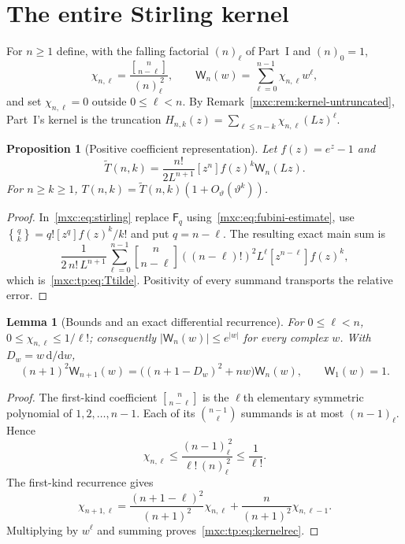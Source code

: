 \documentclass[11pt]{article}
\numberwithin{equation}{section}
\newtheorem{proposition}[theorem]{Proposition}
\newtheorem{lemma}[theorem]{Lemma}
\theoremstyle{definition}
\theoremstyle{remark}
\newcommand{\StirOne}[2]{\genfrac{[}{]}{0pt}{}{#1}{#2}}
\newcommand{\StirTwo}[2]{\genfrac{\{} {\}}{0pt}{}{#1}{#2}}
\begin{document}
\section{The entire Stirling kernel}\label{mxc:tp:sec:kernel}

For $n\ge1$ define, with the falling factorial $(n)_\ell$ of Part~I and
$(n)_0=1$,
\begin{equation}\label{mxc:tp:eq:kerneldef}
 \chi_{n,\ell}=\frac{\StirOne{n}{n-\ell}}{(n)_\ell^{\,2}},\qquad
 \mathsf W_n(w)=\sum_{\ell=0}^{n-1}\chi_{n,\ell}w^\ell,
\end{equation}
and set $\chi_{n,\ell}=0$ outside $0\le\ell<n$. By
Remark~\ref{mxc:rem:kernel-untruncated}, Part~I's kernel is the truncation
$H_{n,k}(z)=\sum_{\ell\le n-k}\chi_{n,\ell}(Lz)^\ell$.

\begin{proposition}[Positive coefficient representation]\label{mxc:tp:prop:kernelrep}
Let $f(z)=e^z-1$ and
\begin{equation}\label{mxc:tp:eq:Ttilde}
 \widetilde T(n,k)=\frac{n!}{2L^{n+1}}[z^n]f(z)^k\mathsf W_n(Lz).
\end{equation}
For $n\ge k\ge1$, $T(n,k)=\widetilde T(n,k)(1+O_\vartheta(\vartheta^k))$.
\end{proposition}
\begin{proof}
In~\eqref{mxc:eq:stirling} replace $\mathsf F_q$
using~\eqref{mxc:eq:fubini-estimate}, use
$\StirTwo qk=q![z^q]f(z)^k/k!$ and put $q=n-\ell$. The resulting exact
main sum is
\[
 \frac{1}{2\,n!\,L^{n+1}}\sum_{\ell=0}^{n-1}\StirOne{n}{n-\ell}
 ((n-\ell)!)^2L^\ell[z^{n-\ell}]f(z)^k,
\]
which is~\eqref{mxc:tp:eq:Ttilde}. Positivity of every summand transports
the relative error.
\end{proof}

\begin{lemma}[Bounds and an exact differential recurrence]\label{mxc:tp:lem:kernelbound}
For $0\le\ell<n$, $0\le\chi_{n,\ell}\le1/\ell!$; consequently
$|\mathsf W_n(w)|\le e^{|w|}$ for every complex $w$. With
$D_w=w\,\mathrm d/\mathrm dw$,
\begin{equation}\label{mxc:tp:eq:kernelrec}
 (n+1)^2\mathsf W_{n+1}(w)=\bigl((n+1-D_w)^2+nw\bigr)\mathsf W_n(w),
 \qquad \mathsf W_1(w)=1.
\end{equation}
\end{lemma}
\begin{proof}
The first-kind coefficient $\StirOne{n}{n-\ell}$ is the $\ell$th
elementary symmetric polynomial of $1,2,\ldots,n-1$. Each of its
$\binom{n-1}{\ell}$ summands is at most $(n-1)_\ell$. Hence
\[
 \chi_{n,\ell}\le\frac{(n-1)_\ell^{\,2}}{\ell!\,(n)_\ell^{\,2}}\le\frac1{\ell!}.
\]
The first-kind recurrence gives
\[
 \chi_{n+1,\ell}=\frac{(n+1-\ell)^2}{(n+1)^2}\chi_{n,\ell}
 +\frac{n}{(n+1)^2}\chi_{n,\ell-1}.
\]
Multiplying by $w^\ell$ and summing proves~\eqref{mxc:tp:eq:kernelrec}.
\end{proof}
\end{document}
